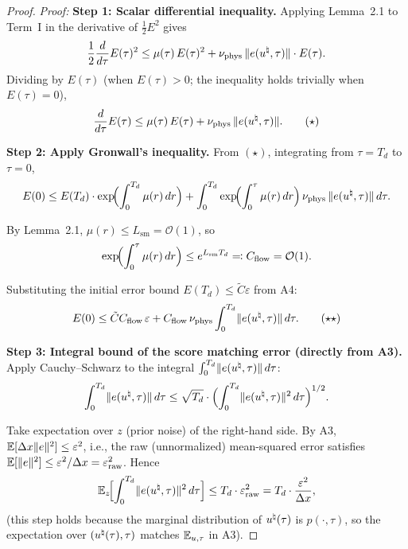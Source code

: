 \begin{proof}
\textit{Proof:}
\textbf{Step 1: Scalar differential inequality.}
Applying Lemma~2.1 to Term~I in the derivative of $\frac{1}{2}E^2$ gives
\begin{equation}
  \frac{1}{2}\frac{d}{d\tau} E(\tau)^2 \leq \mu(\tau) \, E(\tau)^2 + \nu_{\mathrm{phys}} \, \lVert e(u^{\natural},\tau) \rVert \cdot E(\tau).
\end{equation}
Dividing by $E(\tau)$ (when $E(\tau) > 0$; the inequality holds trivially when $E(\tau) = 0$),
\begin{equation}\label{eq:star}
  \frac{d}{d\tau} E(\tau) \leq \mu(\tau) \, E(\tau) + \nu_{\mathrm{phys}} \, \lVert e(u^{\natural},\tau) \rVert. \tag{$\star$}
\end{equation}

\textbf{Step 2: Apply Gronwall's inequality.}
From $(\star)$, integrating from $\tau = T_d$ to $\tau = 0$,
\begin{equation}
  E(0) \leq E(T_d) \cdot \exp\!\Bigl(\int_0^{T_d} \mu(r) \, dr\Bigr) + \int_0^{T_d} \exp\!\Bigl(\int_0^\tau \mu(r) \, dr\Bigr) \, \nu_{\mathrm{phys}} \, \lVert e(u^{\natural},\tau) \rVert \, d\tau.
\end{equation}

By Lemma~2.1, $\mu(r) \leq L_{\mathrm{sm}} = \mathcal{O}(1)$, so
\begin{equation}
  \exp\!\Bigl(\int_0^\tau \mu(r) \, dr\Bigr) \leq e^{L_{\mathrm{sm}} T_d} \eqqcolon C_{\mathrm{flow}} = \mathcal{O}(1).
\end{equation}

Substituting the initial error bound $E(T_d) \leq \tilde{C}\varepsilon$ from A4:
\begin{equation}\label{eq:starstar}
  E(0) \leq \tilde{C} C_{\mathrm{flow}} \, \varepsilon + C_{\mathrm{flow}} \, \nu_{\mathrm{phys}} \int_0^{T_d} \lVert e(u^{\natural},\tau) \rVert \, d\tau. \tag{$\star\star$}
\end{equation}

\textbf{Step 3: Integral bound of the score matching error (directly from A3).}
Apply Cauchy--Schwarz to the integral $\int_0^{T_d} \lVert e(u^{\natural},\tau) \rVert \, d\tau$:
\begin{equation}
  \int_0^{T_d} \lVert e(u^{\natural},\tau) \rVert \, d\tau \leq \sqrt{T_d} \cdot \Bigl(\int_0^{T_d} \lVert e(u^{\natural},\tau) \rVert^2 \, d\tau\Bigr)^{1/2}.
\end{equation}

Take expectation over $z$ (prior noise) of the right-hand side. By A3, $\mathbb{E}[\Delta x \lVert e \rVert^2] \leq \varepsilon^2$, i.e., the raw (unnormalized) mean-squared error satisfies $\mathbb{E}[\lVert e \rVert^2] \leq \varepsilon^2 / \Delta x = \varepsilon_{\mathrm{raw}}^2$. Hence
\begin{equation}
  \mathbb{E}_z\!\Bigl[\int_0^{T_d} \lVert e(u^{\natural},\tau) \rVert^2 \, d\tau\Bigr] \leq T_d \cdot \varepsilon_{\mathrm{raw}}^2 = T_d \cdot \frac{\varepsilon^2}{\Delta x},
\end{equation}
(this step holds because the marginal distribution of $u^{\natural}(\tau)$ is $p(\cdot,\tau)$, so the expectation over $(u^{\natural}(\tau),\tau)$ matches $\mathbb{E}_{u,\tau}$ in A3).


\end{proof}
